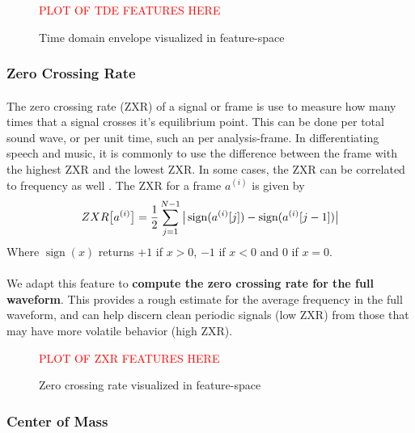 \documentclass[12pt,letterpaper]{article}
\DeclareMathOperator{\sign}{\text{sign}}
\begin{document}
\begin{figure}[H]
\label{fig-FeatureTDE}
\begin{center}
\textcolor{red}{PLOT OF TDE FEATURES HERE}
\end{center}
\caption{Time domain envelope visualized in feature-space}
\end{figure}

\subsubsection{Zero Crossing Rate}

\paragraph*{}The zero crossing rate (ZXR) of a signal or frame is use to measure how many times that a signal crosses it's equilibrium point. This can be done per total sound wave, or per unit time, such an per analysis-frame. In differentiating speech and music, it is commonly to use the difference between the frame with the highest ZXR and the lowest ZXR. In some cases, the ZXR can be correlated to frequency as well \cite{Kahn,Zhang}. The ZXR for a frame $a^{(i)}$ is given by \cite{Virtanen,Liu}
\begin{equation}
\label{eqn-ZXR}
ZXR\big[ a^{(i)} \big] = \frac{1}{2} \sum_{j=1}^{N-1} \big{|} \sign(a^{(i)}[j]) - \sign(a^{(i)}[j-1]) \big{|} 
\end{equation}
Where $\sign(x)$ returns $+1$ if $x > 0$, $-1$ if $x < 0$ and $0$ if $x = 0$.

\paragraph*{}We adapt this feature to \textbf{compute the zero crossing rate for the full waveform}. This provides a rough estimate for the average frequency in the full waveform, and can help discern clean periodic signals (low ZXR) from those that may have more volatile behavior (high ZXR)\cite{Virtanen}.

\begin{figure}[H]
\label{fig-FeatureZXR}
\begin{center}
\textcolor{red}{PLOT OF ZXR FEATURES HERE}
\end{center}
\caption{Zero crossing rate visualized in feature-space}
\end{figure}

\subsubsection{Center of Mass}
\end{document}
